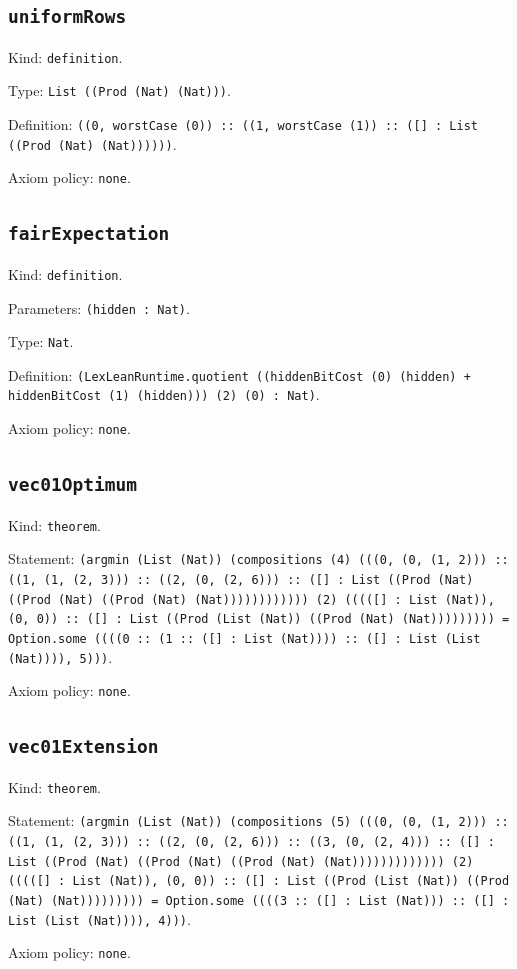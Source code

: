 \documentclass[11pt]{article}
\begin{document}
\subsection*{\texttt{uniformRows}}
\noindent Kind: \texttt{definition}.\par
\noindent Type: \texttt{List ((Prod (Nat) (Nat)))}.\par
\noindent Definition: \texttt{((0, worstCase (0)) :: ((1, worstCase (1)) :: ([] : List ((Prod (Nat) (Nat))))))}.\par
\noindent Axiom policy: \texttt{none}.\par
\subsection*{\texttt{fairExpectation}}
\noindent Kind: \texttt{definition}.\par
\noindent Parameters: \texttt{(hidden : Nat)}.\par
\noindent Type: \texttt{Nat}.\par
\noindent Definition: \texttt{(LexLeanRuntime.quotient ((hiddenBitCost (0) (hidden) + hiddenBitCost (1) (hidden))) (2) (0) : Nat)}.\par
\noindent Axiom policy: \texttt{none}.\par
\subsection*{\texttt{vec01Optimum}}
\noindent Kind: \texttt{theorem}.\par
\noindent Statement: \texttt{(argmin (List (Nat)) (compositions (4) (((0, (0, (1, 2))) :: ((1, (1, (2, 3))) :: ((2, (0, (2, 6))) :: ([] : List ((Prod (Nat) ((Prod (Nat) ((Prod (Nat) (Nat)))))))))))) (2) (((([] : List (Nat)), (0, 0)) :: ([] : List ((Prod (List (Nat)) ((Prod (Nat) (Nat))))))))) = Option.some ((((0 :: (1 :: ([] : List (Nat)))) :: ([] : List (List (Nat)))), 5)))}.\par
\noindent Axiom policy: \texttt{none}.\par
\subsection*{\texttt{vec01Extension}}
\noindent Kind: \texttt{theorem}.\par
\noindent Statement: \texttt{(argmin (List (Nat)) (compositions (5) (((0, (0, (1, 2))) :: ((1, (1, (2, 3))) :: ((2, (0, (2, 6))) :: ((3, (0, (2, 4))) :: ([] : List ((Prod (Nat) ((Prod (Nat) ((Prod (Nat) (Nat))))))))))))) (2) (((([] : List (Nat)), (0, 0)) :: ([] : List ((Prod (List (Nat)) ((Prod (Nat) (Nat))))))))) = Option.some ((((3 :: ([] : List (Nat))) :: ([] : List (List (Nat)))), 4)))}.\par
\noindent Axiom policy: \texttt{none}.\par
\end{document}
